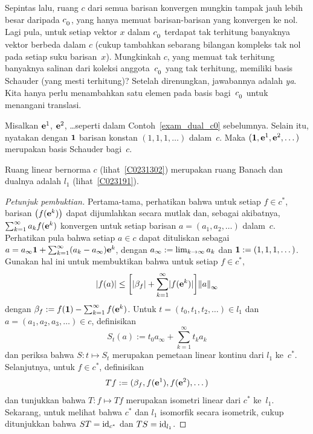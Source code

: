 Sepintas lalu, ruang $c$ dari semua barisan konvergen mungkin tampak jauh lebih besar daripada $c_{{}_{\scriptstyle{0}}}$,
yang hanya memuat barisan-barisan yang konvergen ke nol. Lagi pula, untuk setiap vektor
$x$ dalam $c_{{}_{\scriptstyle{0}}}$ terdapat tak terhitung banyaknya vektor berbeda dalam $c$ (cukup tambahkan sebarang bilangan kompleks
tak nol pada setiap suku barisan~$x$). Mungkinkah $c$, yang memuat tak terhitung banyaknya
salinan dari koleksi anggota~$c_{{}_{\scriptstyle{0}}}$ yang tak terhitung, memiliki basis Schauder (yang mesti terhitung)?
Setelah direnungkan, jawabannya adalah \emph{ya}. Kita hanya perlu menambahkan satu elemen
pada basis bagi~$c_{{}_{\scriptstyle{0}}}$ untuk menangani translasi.

\begin{exam} Misalkan $\mathbf{e}^1$, $\mathbf{e}^2$, \dots seperti dalam Contoh~\ref{exam_dual_c0} sebelumnya. Selain itu,
nyatakan dengan $\mathbf{1}$ barisan konstan $(1,1,1,\dots)$ dalam~$c$. Maka $(\mathbf{1}, \mathbf{e}^1, \mathbf{e}^2, \dots)$
merupakan basis Schauder bagi~$c$.
\end{exam}

\begin{exam}\label{exam_dual_c} Ruang linear bernorma $c$ (lihat~\ref{C0231302})
merupakan ruang Banach dan dualnya adalah $l_1$ (lihat~\ref{C023191}).
\end{exam}

\begin{proof}[\emph{Petunjuk pembuktian}]
\leavevmode\par\noindent
Pertama-tama, perhatikan bahwa untuk setiap $f \in c^*$, barisan
$\bigl(f(\mathbf{e}^k)\bigr)$ dapat dijumlahkan secara mutlak dan, sebagai akibatnya, $\sum_{k=1}^\infty a_k f(\mathbf{e}^k)$
konvergen untuk setiap barisan $a = (a_1,a_2,\dots)$ dalam~$c$. Perhatikan pula bahwa setiap $a \in c$ dapat dituliskan sebagai
$a = a_\infty \mathbf{1} + \sum_{k=1}^\infty (a_k -a_\infty)\mathbf{e}^k$, dengan $a_\infty := \lim_{k \rightarrow \infty}a_k$
dan $\mathbf{1} := (1,1,1,\dots)$. Gunakan hal ini untuk membuktikan bahwa untuk setiap $f \in c^*$,
   \[ \lvert f(a)\rvert \le \biggl[ \lvert\beta_f\rvert + \sum_{k=1}^\infty \lvert f(\mathbf{e}^k)\rvert \biggr] {\lVert a\rVert}_\infty \]
dengan $\beta_f := f(\mathbf{1}) - \sum_{k=1}^\infty f(\mathbf{e}^k)$. Untuk $t = (t_0,t_1,t_2,\dots) \in l_1$ dan
$a = (a_1,a_2,a_3,\dots) \in c$, definisikan
   \[ S_t(a) := t_0 a_\infty + \sum_{k=1}^\infty t_ka_k \]
dan periksa bahwa $S\colon t \mapsto S_t$ merupakan pemetaan linear kontinu dari $l_1$ ke~$c^*$.
Selanjutnya, untuk $f \in c^*$, definisikan
   \[ Tf := (\beta_f, f(\mathbf{e}^1), f(\mathbf{e}^2), \dots) \]
dan tunjukkan bahwa $T\colon f \mapsto Tf$ merupakan isometri linear dari $c^*$ ke~$l_1$. Sekarang, untuk melihat bahwa $c^*$ dan
$l_1$ isomorfik secara isometrik, cukup ditunjukkan bahwa $ST = \operatorname{id}_{c^*}$ dan $TS = \operatorname{id}_{l_1}$.  \ns
\end{proof}












